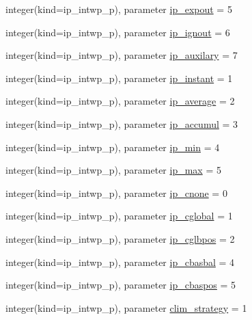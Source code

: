 \begin{DoxyCompactItemize}
\item 
integer(kind=ip\+\_\+intwp\+\_\+p), parameter \hyperlink{classmod__oasis__parameters_ae91d5161b091e1f07e6ee64a38514df6}{ip\+\_\+expout} = 5
\item 
integer(kind=ip\+\_\+intwp\+\_\+p), parameter \hyperlink{classmod__oasis__parameters_a4d283e27ebb49e8d97a35842f10d9aec}{ip\+\_\+ignout} = 6
\item 
integer(kind=ip\+\_\+intwp\+\_\+p), parameter \hyperlink{classmod__oasis__parameters_a4e90463865a09309212e947e8c8546ac}{ip\+\_\+auxilary} = 7
\item 
integer(kind=ip\+\_\+intwp\+\_\+p), parameter \hyperlink{classmod__oasis__parameters_a1028581caadcb9d7506b25c6cd3efd01}{ip\+\_\+instant} = 1
\item 
integer(kind=ip\+\_\+intwp\+\_\+p), parameter \hyperlink{classmod__oasis__parameters_a5e40e91da22fca8f2b6a9d4f1c1ace5d}{ip\+\_\+average} = 2
\item 
integer(kind=ip\+\_\+intwp\+\_\+p), parameter \hyperlink{classmod__oasis__parameters_adfaf98517b8396e4ba667f2f8bcd0ed5}{ip\+\_\+accumul} = 3
\item 
integer(kind=ip\+\_\+intwp\+\_\+p), parameter \hyperlink{classmod__oasis__parameters_a194cfc3b7f2d515492e04fd6e8931c60}{ip\+\_\+min} = 4
\item 
integer(kind=ip\+\_\+intwp\+\_\+p), parameter \hyperlink{classmod__oasis__parameters_abe7b7d586b50bd7c7d77c7834efa2801}{ip\+\_\+max} = 5
\item 
integer(kind=ip\+\_\+intwp\+\_\+p), parameter \hyperlink{classmod__oasis__parameters_ae043e4e2c2b7f04fec7d8c061ef52934}{ip\+\_\+cnone} = 0
\item 
integer(kind=ip\+\_\+intwp\+\_\+p), parameter \hyperlink{classmod__oasis__parameters_ae251e3ac1c9c82ae5db2a768d2d59d5f}{ip\+\_\+cglobal} = 1
\item 
integer(kind=ip\+\_\+intwp\+\_\+p), parameter \hyperlink{classmod__oasis__parameters_aec700ad0c6a11dd35e5d6c2afb745fd0}{ip\+\_\+cglbpos} = 2
\item 
integer(kind=ip\+\_\+intwp\+\_\+p), parameter \hyperlink{classmod__oasis__parameters_aaa7ead98ff7d53acfd539a32fca9e2c7}{ip\+\_\+cbasbal} = 4
\item 
integer(kind=ip\+\_\+intwp\+\_\+p), parameter \hyperlink{classmod__oasis__parameters_a3b96d31bbe142d84df2b93880498936f}{ip\+\_\+cbaspos} = 5
\item 
integer(kind=ip\+\_\+intwp\+\_\+p), parameter \hyperlink{classmod__oasis__parameters_a611cae6f3c65a75f26e76b2f88f34037}{clim\+\_\+strategy} = 1

\end{DoxyCompactItemize}
